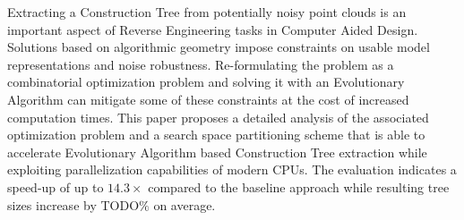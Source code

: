 Extracting a Construction Tree from potentially noisy point clouds is an important aspect of Reverse Engineering tasks in Computer Aided Design. 
Solutions based on algorithmic geometry impose constraints on usable model representations and noise robustness. 
Re-formulating the problem as a combinatorial optimization problem and solving it with an Evolutionary Algorithm can mitigate some of these constraints at the cost of increased computation times. 
This paper proposes a detailed analysis of the associated optimization problem and a search space partitioning scheme that is able to accelerate Evolutionary Algorithm based Construction Tree extraction while exploiting parallelization capabilities of modern CPUs.
The evaluation indicates a speed-up of up to $14.3\times$ compared to the baseline approach while resulting tree sizes increase by TODO$\%$ on average. 
